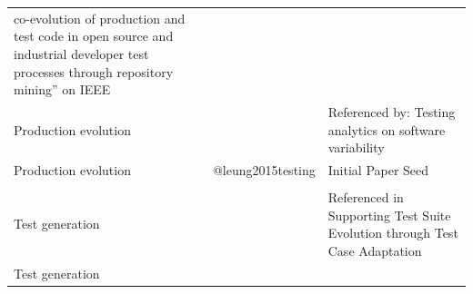 \documentclass[]{book}
\begin{document}
\begin{longtable}[]{@{}lll@{}}
\begin{minipage}[t]{0.32\columnwidth}
co-evolution of production and test code in open source and industrial
developer test processes through repository mining'' on IEEE\strut
\end{minipage}\tabularnewline
\begin{minipage}[t]{0.19\columnwidth}\raggedright\strut
Production evolution\strut
\end{minipage} & \begin{minipage}[t]{0.41\columnwidth}\raggedright\strut
\citet{eick2001}\strut
\end{minipage} & \begin{minipage}[t]{0.32\columnwidth}\raggedright\strut
Referenced by: Testing analytics on software variability\strut
\end{minipage}\tabularnewline
\begin{minipage}[t]{0.19\columnwidth}\raggedright\strut
Production evolution\strut
\end{minipage} & \begin{minipage}[t]{0.41\columnwidth}\raggedright\strut
@leung2015testing\strut
\end{minipage} & \begin{minipage}[t]{0.32\columnwidth}\raggedright\strut
Initial Paper Seed\strut
\end{minipage}\tabularnewline
\begin{minipage}[t]{0.19\columnwidth}\raggedright\strut
\strut
\end{minipage} & \begin{minipage}[t]{0.41\columnwidth}\raggedright\strut
\strut
\end{minipage} & \begin{minipage}[t]{0.32\columnwidth}\raggedright\strut
\strut
\end{minipage}\tabularnewline
\begin{minipage}[t]{0.19\columnwidth}\raggedright\strut
Test generation\strut
\end{minipage} & \begin{minipage}[t]{0.41\columnwidth}\raggedright\strut
\citet{robinson2011}\strut
\end{minipage} & \begin{minipage}[t]{0.32\columnwidth}\raggedright\strut
Referenced in Supporting Test Suite Evolution through Test Case
Adaptation\strut
\end{minipage}\tabularnewline
\begin{minipage}[t]{0.19\columnwidth}\raggedright\strut
Test generation\strut
\end{minipage} & \begin{minipage}[t]{0.41\columnwidth}\raggedright\strut

\end{minipage}
\end{longtable}
\end{document}
